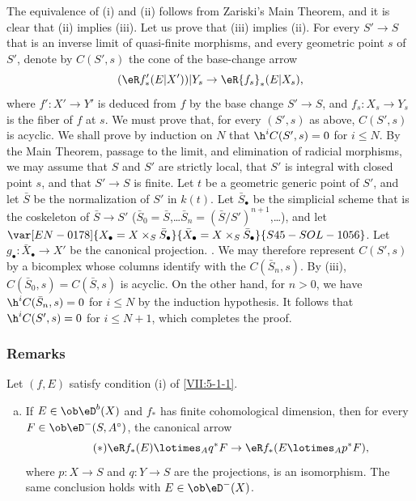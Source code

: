 The equivalence of (i) and (ii) follows from Zariski's Main Theorem, and it is
clear that (ii) implies (iii). Let us prove that (iii) implies (ii). For every
$S'\to S$ that is an inverse limit of quasi-finite morphisms, and every
geometric point $s$ of $S'$, denote by $C(S',s)$ the cone of the base-change
arrow
\[
  (\eR f'_\ast(E|X'))|Y_s \to \eR{f_s}_\ast (E|X_s) \text{,} 
\]
where $f':X'\to Y'$ is deduced from $f$ by the base change $S'\to S$, and
$f_s:X_s\to Y_s$ is the fiber of $f$ at $s$. We must prove that, for every
$(S',s)$ as above, $C(S',s)$ is acyclic. We shall prove by induction on $N$ that
$\h^i C(S',s) = 0$ for $i\leqslant N$. By the Main Theorem, passage to the
limit, and elimination of radicial morphisms, we may assume that $S$ and $S'$
are strictly local, that $S'$ is integral with closed point $s$, and that
$S'\to S$ is finite. Let $t$ be a geometric generic point of $S'$, and let
$\bar S$ be the normalization of $S'$ in $k(t)$. Let $\bar S_\bullet$ be the
simplicial scheme that is the coskeleton of $\bar S\to S'$
($\bar S_0=\bar S$,\ldots $\bar S_n=(\bar S/S')^{n+1}$,\ldots), and let
$\var[EN-0178]{X_\bullet=X\times_S \bar S_\bullet}{\bar X_\bullet=X\times_S \bar S_\bullet}{S45-SOL-1056}$. Let
$g_\bullet:\bar X_\bullet \to X'$ be the canonical projection. 
. We may therefore represent $C(S',s)$ by a bicomplex whose
columns identify with the $C(\bar S_n,s)$. By (iii),
$C(\bar S_0,s)=C(\bar S,s)$ is acyclic. On the other hand, for $n>0$, we have
$\h^i C(\bar S_n,s)=0$ for $i\leqslant N$ by the induction hypothesis. It
follows that $\h^i C(S',s)=0$ for $i\leqslant N+1$, which completes the proof.





\subsubsection{Remarks}\label{VII:5-1-2}

Let $(f,E)$ satisfy condition (i) of \ref{VII:5-1-1}.
\begin{enumerate}[a)]
  \item If $E\in \ob \eD^b(X)$ and $f_\ast$ has finite cohomological
    dimension, then for every $F\in \ob\eD^-(S,A^\circ)$, the canonical arrow
    \begin{equation*}\tag{$*$}\label{VII:eq:5-1-1-1}
      \eR f_\ast(E)\lotimes_A q^\ast F \to \eR f_\ast(E\lotimes_A p^\ast F) \text{,} 
    \end{equation*}
    where $p:X\to S$ and $q:Y\to S$ are the projections, is an isomorphism.
    The same conclusion holds with $E\in\ob\eD^-(X)$.
\end{enumerate} 

